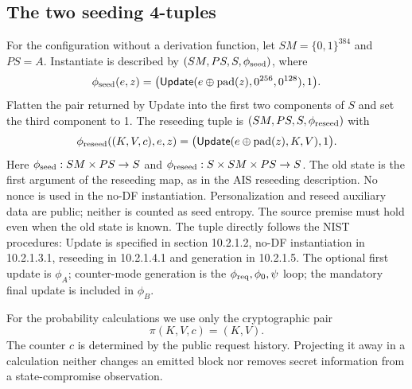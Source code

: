 \documentclass[journal=tosc,preprint,floatrow,nohyperxmp]{iacrtrans}
\newif\ifjordireview
\newcounter{jordinote}
\newcommand{\jordinote}[2]{%
  \ifjordireview
  \stepcounter{jordinote}\par\medskip\noindent
  \fcolorbox{blue!55!black}{blue!4}{%
    \begin{minipage}{\dimexpr\linewidth-2\fboxsep-2\fboxrule\relax}
    \small\raggedright\color{blue!45!black}
    \textbf{Solo Jordi -- J\thejordinote: #1}\par\smallskip
    #2
    \end{minipage}}\par\medskip
  \fi
}
\numberwithin{lemma}{section}
\numberwithin{proposition}{section}
\newcommand{\bits}{\{0,1\}}
\newcommand{\Upd}{\ensuremath{\mathsf{Update}}}
\newcommand{\pad}{\operatorname{pad}}
\numberwithin{equation}{section}
\theoremstyle{definition}
\numberwithin{definition}{section}
\theoremstyle{plain}
\begin{document}
\jordinote{La tupla debe ejecutar la 90A}{Lee una petición a mano: entrada no vacía activa pre-Update; después salen los bloques; siempre hay post-Update con la misma máscara. Distingue $\phi_0$ de $\phi$: incrementar el contador temporal no es la transición cuyo carácter unidireccional queremos justificar. Comprueba el primer incremento, el índice del último bloque, el truncamiento y la diferencia entre Null y una cadena no vacía de ceros.}

\subsection{The two seeding 4-tuples}
For the configuration without a derivation function, let $SM=\bits^{384}$ and $PS=A$. Instantiate is described by $(SM,PS,S,\phi_{\rm seed})$, where
\begin{equation}
 \phi_{\rm seed}(e,z)=\bigl(\Upd(e\oplus \pad(z),0^{256},0^{128}),1\bigr).\label{eq:seed}
\end{equation}
Flatten the pair returned by Update into the first two components of $S$ and set the third component to 1. The reseeding tuple is $(SM,PS,S,\phi_{\rm reseed})$ with
\begin{equation}
 \phi_{\rm reseed}((K,V,c),e,z)=
 \bigl(\Upd(e\oplus \pad(z),K,V),1\bigr).\label{eq:reseed}
\end{equation}
Here $\phi_{\rm seed}:SM\times PS\to S$ and $\phi_{\rm reseed}:S\times SM\times PS\to S$. The old state is the first argument of the reseeding map, as in the AIS reseeding description. No nonce is used in the no-DF instantiation. Personalization and reseed auxiliary data are public; neither is counted as seed entropy. The source premise must hold even when the old state is known.
The tuple directly follows the NIST procedures: Update is specified in section 10.2.1.2, no-DF instantiation in 10.2.1.3.1, reseeding in 10.2.1.4.1 and generation in 10.2.1.5. The optional first update is $\phi_A$; counter-mode generation is the $\phi_{\rm req},\phi_0,\psi$ loop; the mandatory final update is included in $\phi_B$.

For the probability calculations we use only the cryptographic pair
\begin{equation}
 \pi(K,V,c)=(K,V).\label{eq:projection}
\end{equation}
The counter $c$ is determined by the public request history. Projecting it away in a calculation neither changes an emitted block nor removes secret information from a state-compromise observation.
\end{document}
